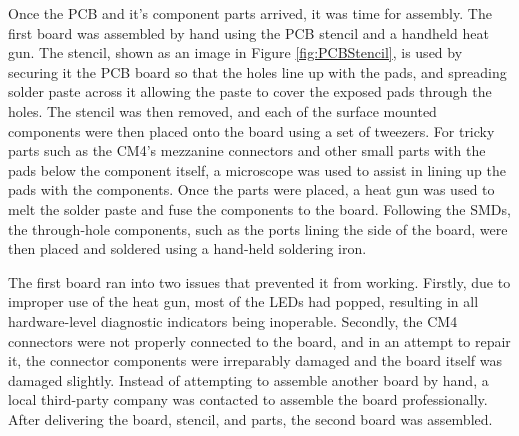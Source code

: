 Once the PCB and it's component parts arrived, it was time for assembly.
The first board was assembled by hand using the PCB stencil and a handheld heat gun.
The stencil, shown as an image in Figure \ref{fig:PCBStencil}, is used by securing it the PCB board so that the holes line up with the pads, and spreading solder paste across it allowing the paste to cover the exposed pads through the holes.
The stencil was then removed, and each of the surface mounted components were then placed onto the board using a set of tweezers.
For tricky parts such as the CM4's mezzanine connectors and other small parts with the pads below the component itself, a microscope was used to assist in lining up the pads with the components.
Once the parts were placed, a heat gun was used to melt the solder paste and fuse the components to the board.
Following the SMDs, the through-hole components, such as the ports lining the side of the board, were then placed and soldered using a hand-held soldering iron.

The first board ran into two issues that prevented it from working.
Firstly, due to improper use of the heat gun, most of the LEDs had popped, resulting in all hardware-level diagnostic indicators being inoperable.
Secondly, the CM4 connectors were not properly connected to the board, and in an attempt to repair it, the connector components were irreparably damaged and the board itself was damaged slightly.
Instead of attempting to assemble another board by hand, a local third-party company was contacted to assemble the board professionally.
After delivering the board, stencil, and parts, the second board was assembled.

